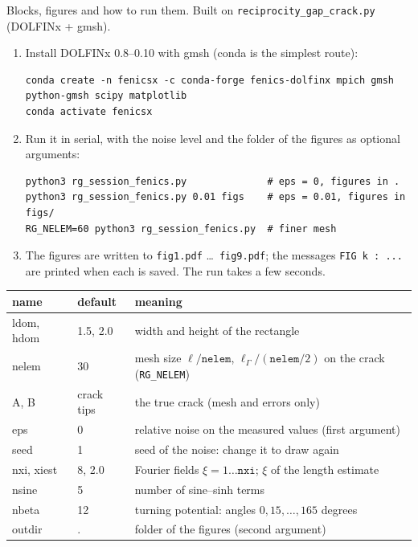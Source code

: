   {Blocks, figures and how to run them. Built on
   \texttt{reciprocity\_gap\_crack.py} (DOLFINx + gmsh).}


\begin{enumerate}[itemsep=1pt]
\item Install DOLFINx 0.8--0.10 with gmsh (conda is the simplest route):
\begin{lstlisting}[style=shstyle]
conda create -n fenicsx -c conda-forge fenics-dolfinx mpich gmsh python-gmsh scipy matplotlib
conda activate fenicsx
\end{lstlisting}
\item Run it in serial, with the noise level and the folder of the figures
as optional arguments:
\begin{lstlisting}[style=shstyle]
python3 rg_session_fenics.py              # eps = 0, figures in .
python3 rg_session_fenics.py 0.01 figs    # eps = 0.01, figures in figs/
RG_NELEM=60 python3 rg_session_fenics.py  # finer mesh
\end{lstlisting}
\item The figures are written to \texttt{fig1.pdf} \dots\ \texttt{fig9.pdf}; the
messages \texttt{FIG k : ...} are printed when each is saved. The run takes a
few seconds.
\end{enumerate}

\begin{center}\small
\begin{tabular}{>{\ttfamily}l l p{8cm}}
\toprule
\rmfamily name & default & meaning\\
\midrule
ldom, hdom & 1.5, 2.0 & width and height of the rectangle\\
nelem & 30 & mesh size $\ell/\texttt{nelem}$, $\ell_\Gamma/(\texttt{nelem}/2)$ on the crack (\texttt{RG\_NELEM})\\
A, B & crack tips & the true crack (mesh and errors only)\\
eps & 0 & relative noise on the measured values (first argument)\\
seed & 1 & seed of the noise: change it to draw again\\
nxi, xiest & 8, 2.0 & Fourier fields $\xi=1\dots\texttt{nxi}$; $\xi$ of the length estimate\\
nsine & 5 & number of sine--sinh terms\\
nbeta & 12 & turning potential: angles $0,15,\dots,165$ degrees\\
outdir & . & folder of the figures (second argument)\\
\bottomrule
\end{tabular}
\end{center}

